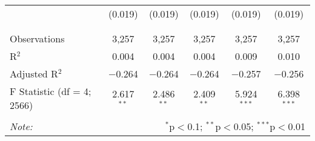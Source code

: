 \begin{table}[!htbp]
\begin{tabular}{@{\extracolsep{5pt}}lccccc}
  & (0.019) & (0.019) & (0.019) & (0.019) & (0.019) \\ 
  & & & & & \\ 
\hline \\[-1.8ex] 
Observations & 3,257 & 3,257 & 3,257 & 3,257 & 3,257 \\ 
R$^{2}$ & 0.004 & 0.004 & 0.004 & 0.009 & 0.010 \\ 
Adjusted R$^{2}$ & $-$0.264 & $-$0.264 & $-$0.264 & $-$0.257 & $-$0.256 \\ 
F Statistic (df = 4; 2566) & 2.617$^{**}$ & 2.486$^{**}$ & 2.409$^{**}$ & 5.924$^{***}$ & 6.398$^{***}$ \\ 
\hline 
\hline \\[-1.8ex] 
\textit{Note:}  & \multicolumn{5}{r}{$^{*}$p$<$0.1; $^{**}$p$<$0.05; $^{***}$p$<$0.01} \\ 
\end{tabular} 
\end{table} 
